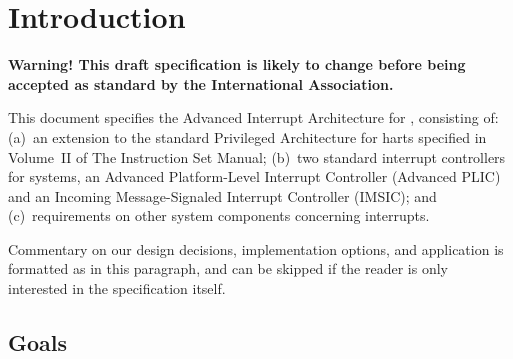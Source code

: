 
\chapter{Introduction}
\label{ch:intro}

\textbf{%
Warning!
This draft specification is likely to change before being accepted as
standard by the {\RISCV} International Association.%
}
\bigskip

This document specifies the Advanced Interrupt Architecture for
{\RISCV}, consisting of:
(a)~an extension to the standard Privileged Architecture for {\RISCV}
harts specified in Volume~II of The {\RISCV} Instruction Set Manual;
(b)~two standard interrupt controllers for {\RISCV} systems, an
Advanced Platform-Level Interrupt Controller (Advanced PLIC) and an
Incoming Message-Signaled Interrupt Controller (IMSIC); and
(c)~requirements on other system components concerning interrupts.

\begin{commentary}
Commentary on our design decisions, implementation options, and
application is formatted as in this paragraph, and can be skipped if
the reader is only interested in the specification itself.
\end{commentary}

\section{Goals}

